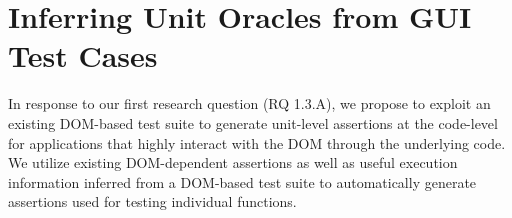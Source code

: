 \chapter{Inferring Unit Oracles from GUI Test Cases} \label{Chap:atrina}
%
%
In response to our first research question (RQ 1.3.A), we propose to exploit an existing DOM-based test suite to generate unit-level assertions at the code-level for applications that highly interact with the DOM through the underlying \javascript code. We utilize
existing DOM-dependent assertions as well as useful execution information inferred from a DOM-based test suite to automatically generate assertions used for testing individual \javascript functions.

